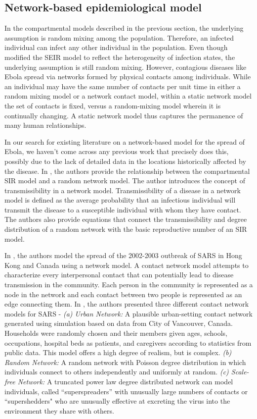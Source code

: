 \documentclass[10pt, journal,onecolumn]{IEEEtran}
\begin{document}
\subsection{{Network-based epidemiological model}}

In the compartmental models described in the previous section, the underlying assumption is random
mixing among the population. Therefore, an infected individual can infect any other individual in the
population. Even though \citep{legrand2007understanding} modified the SEIR model to reflect the
heterogeneity of infection states, the underlying assumption is still random mixing. However,
contagious diseases like Ebola spread via networks formed by physical contacts among individuals.
While an individual may have the same number of contacts per unit time in either a random mixing
model or a network contact model, within a static network model the set of contacts is fixed, versus
a random-mixing model wherein it is continually changing. A static network model thus captures the
permanence of many human relationships.

In our search for existing literature on a network-based model for the spread of Ebola, we haven't come
across any previous work that precisely does this, possibly due to the lack of detailed data in the
locations historically affected by the disease.  In \citep{newman2002spread}, the authors provide
the relationship between the compartmental SIR model and a random network model. The author introduces
the concept of transmissibility in a network model. Transmissibility of a disease in a network model
is defined as the average probability that an infectious individual will transmit the disease to a
susceptible individual with whom they have contact. The authors also provide equations that connect
the transmissibility and degree distribution of a random network with the basic reproductive number
of an SIR model.

In \citep{meyers2005network}, the authors model the spread of the 2002-2003 outbreak of SARS in Hong
Kong and Canada using a network model. A contact network model attempts to characterize every
interpersonal contact that can potentially lead to disease transmission in the community. Each
person in the community is represented as a node in the network and each contact between two people
is represented as an edge connecting them. In \citep{meyers2005network}, the authors presented three
different contact network models for SARS -  \textit{(a) Urban Network:} A plausible urban-setting
contact network generated using simulation based on data from City of Vancouver, Canada. Households
were randomly chosen and  their members given ages, schools, occupations, hospital beds as patients,
and  caregivers according to statistics from public data.  This model offers a high degree of
realism, but is complex. \textit{(b) Random Network:} A random network with Poisson degree
distribution in which individuals connect to others independently and uniformly at random.
\textit{(c) Scale-free Network:}  A truncated power law degree distributed network can model
individuals, called ``superspreaders'' with unusually large numbers of contacts or ``supershedders"
who are unusually effective at excreting the virus into the environment they share with others.
\end{document}
